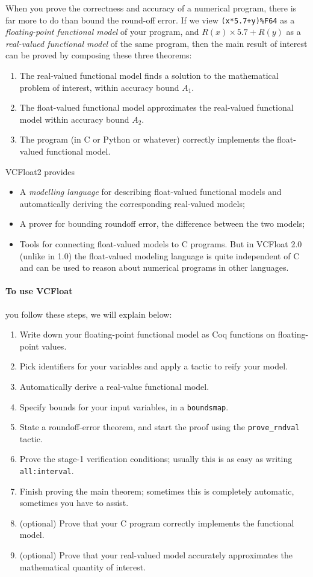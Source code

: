 \documentclass[article]{memoir}
\begin{document}
When you prove the correctness and accuracy of a numerical program,
there is far more to do than bound the round-off error.
If we view \lstinline{(x*5.7+y)%F64} as a \emph{floating-point functional model}
  of your program, and $R(x)\times 5.7+R(y)$ as a
  \emph{real-valued functional model} of the same program, then
  the main result of interest can be proved by composing
  these three theorems:
\begin{enumerate}
  \item The real-valued functional model finds a solution to
    the mathematical problem of interest, within accuracy bound $A_1$.
  \item The float-valued functional model approximates the
    real-valued functional model within accuracy bound $A_2$.
  \item The program (in C or Python or whatever) correctly implements
    the float-valued functional model.
\end{enumerate}
VCFloat2 provides
\begin{itemize}
\item A \emph{modelling language} for describing float-valued functional
  models and automatically deriving the corresponding real-valued models;
\item A prover for bounding roundoff error, the difference between the two models;
\item Tools for connecting float-valued models to C programs.  But
  in VCFloat 2.0 (unlike in 1.0) the float-valued modeling language
  is quite independent of C and can be used to reason about numerical
  programs in other languages.
\end{itemize}

\paragraph{To use VCFloat} you follow these steps, we will explain below:
\begin{enumerate}
\item Write down your floating-point functional model as Coq functions on floating-point values.
\item Pick identifiers for your variables and apply a tactic to reify your model.
\item Automatically derive a real-value functional model.
\item Specify bounds for your input variables, in a \lstinline{boundsmap}.
\item State a roundoff-error theorem, and start the proof using the
  \lstinline{prove_rndval} tactic.
\item Prove the stage-1 verification conditions; usually this is as easy as
  writing \lstinline{all:interval}.
\item Finish proving the main theorem; sometimes this is completely automatic, sometimes you have to assist.
\item (optional) Prove that your C program correctly implements the functional model.
\item (optional) Prove that your real-valued model accurately approximates the
  mathematical quantity of interest.
\end{enumerate}
\end{document}
